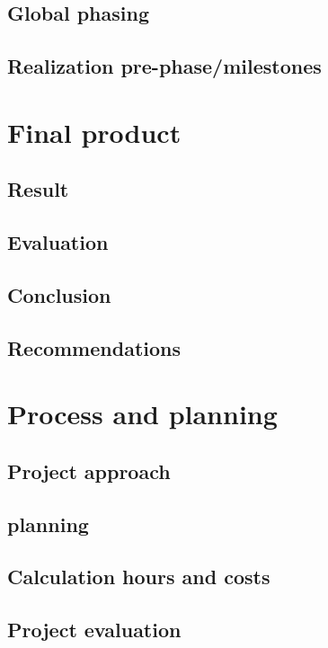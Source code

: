 \documentclass[12pt,a4paper]{report}
\begin{document}
\section{Global phasing}

\section{Realization pre-phase/milestones}

\chapter{Final product}
\section{Result}

\section{Evaluation}

\section{Conclusion}

\section{Recommendations}

\chapter{Process and planning}
\section{Project  approach}

\section{planning}

\section{Calculation hours and costs}

\section{Project evaluation}
\end{document}

